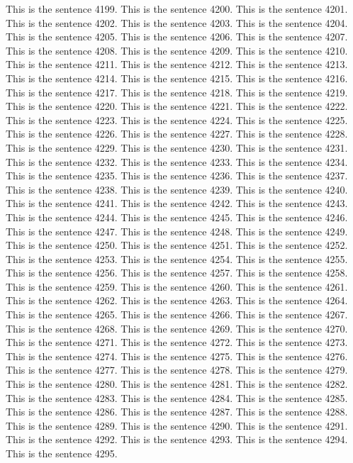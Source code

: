 \documentclass{article}
\begin{document}
This is the sentence 4199.
This is the sentence 4200.
This is the sentence 4201.
This is the sentence 4202.
This is the sentence 4203.
This is the sentence 4204.
This is the sentence 4205.
This is the sentence 4206.
This is the sentence 4207.
This is the sentence 4208.
This is the sentence 4209.
This is the sentence 4210.
This is the sentence 4211.
This is the sentence 4212.
This is the sentence 4213.
This is the sentence 4214.
This is the sentence 4215.
This is the sentence 4216.
This is the sentence 4217.
This is the sentence 4218.
This is the sentence 4219.
This is the sentence 4220.
This is the sentence 4221.
This is the sentence 4222.
This is the sentence 4223.
This is the sentence 4224.
This is the sentence 4225.
This is the sentence 4226.
This is the sentence 4227.
This is the sentence 4228.
This is the sentence 4229.
This is the sentence 4230.
This is the sentence 4231.
This is the sentence 4232.
This is the sentence 4233.
This is the sentence 4234.
This is the sentence 4235.
This is the sentence 4236.
This is the sentence 4237.
This is the sentence 4238.
This is the sentence 4239.
This is the sentence 4240.
This is the sentence 4241.
This is the sentence 4242.
This is the sentence 4243.
This is the sentence 4244.
This is the sentence 4245.
This is the sentence 4246.
This is the sentence 4247.
This is the sentence 4248.
This is the sentence 4249.
This is the sentence 4250.
This is the sentence 4251.
This is the sentence 4252.
This is the sentence 4253.
This is the sentence 4254.
This is the sentence 4255.
This is the sentence 4256.
This is the sentence 4257.
This is the sentence 4258.
This is the sentence 4259.
This is the sentence 4260.
This is the sentence 4261.
This is the sentence 4262.
This is the sentence 4263.
This is the sentence 4264.
This is the sentence 4265.
This is the sentence 4266.
This is the sentence 4267.
This is the sentence 4268.
This is the sentence 4269.
This is the sentence 4270.
This is the sentence 4271.
This is the sentence 4272.
This is the sentence 4273.
This is the sentence 4274.
This is the sentence 4275.
This is the sentence 4276.
This is the sentence 4277.
This is the sentence 4278.
This is the sentence 4279.
This is the sentence 4280.
This is the sentence 4281.
This is the sentence 4282.
This is the sentence 4283.
This is the sentence 4284.
This is the sentence 4285.
This is the sentence 4286.
This is the sentence 4287.
This is the sentence 4288.
This is the sentence 4289.
This is the sentence 4290.
This is the sentence 4291.
This is the sentence 4292.
This is the sentence 4293.
This is the sentence 4294.
This is the sentence 4295.
\end{document}
